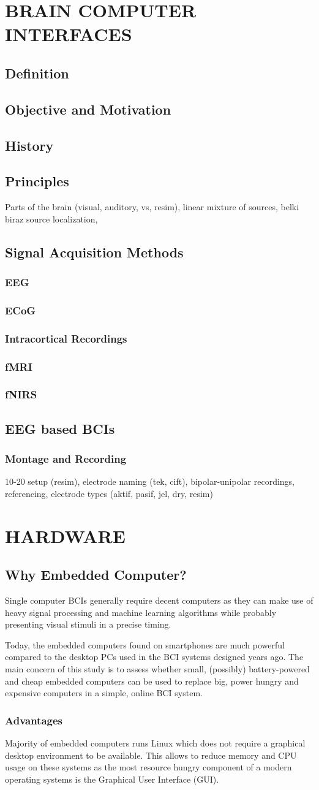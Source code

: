 \documentclass[12pt]{article}
\newcommand\mysection[1]{\vspace*{-0.35cm}\section{#1}\vspace*{6pt}\thispagestyle{empty}}
\newcommand\mysubsection[1]{\subsection{#1}}
\newcommand\mysubsubsection[1]{\subsubsection{#1}}
\numberwithin{equation}{section}
\numberwithin{figure}{section}
\numberwithin{table}{section}
\begin{document}
\mysection{BRAIN COMPUTER INTERFACES}\label{seq:bci}

\mysubsection{Definition}\label{seq:bci_definition}
\mysubsection{Objective and Motivation}\label{seq:bci_motivation}
\mysubsection{History}\label{seq:bci_history}
\mysubsection{Principles}\label{seq:bci_principles}
\par{
Parts of the brain (visual, auditory, vs, resim), linear mixture of sources, belki biraz source localization, 
}

\mysubsection{Signal Acquisition Methods}\label{seq:bci_methods}
\mysubsubsection{EEG}\label{seq:bci_methods_eeg}
\mysubsubsection{ECoG}\label{seq:bci_methods_ecog}
\mysubsubsection{Intracortical Recordings}\label{seq:bci_methods_intracortical}
\mysubsubsection{fMRI}\label{seq:bci_methods_fmri}
\mysubsubsection{fNIRS}\label{seq:bci_methods_fnirs}


\mysubsection{EEG based BCIs}\label{seq:eeg_bci}
\mysubsubsection{Montage and Recording}\label{seq:eeg_recording}
\par{
10-20 setup (resim), electrode naming (tek, cift), bipolar-unipolar recordings, referencing, 
electrode types (aktif, pasif, jel, dry, resim)
}

\clearpage
\vspace*{-0.35cm}
\mysection{HARDWARE}\label{seq:hardware}

\mysubsection{Why Embedded Computer?}\label{seq:embeddedcomputer}

\par{
Single computer BCIs generally require decent computers as they can make use of heavy signal processing 
and machine learning algorithms while probably presenting visual stimuli in a precise timing.
}

\par{
Today, the embedded computers found on smartphones are much powerful compared to the desktop PCs 
used in the BCI systems designed years ago. The main concern of this study is to assess whether small, 
(possibly) battery-powered and cheap embedded computers can be used to replace big, power hungry and 
expensive computers in a simple, online BCI system.
}

\mysubsubsection{Advantages}\label{seq:embeddedcomputer_advantages}

\par{
Majority of embedded computers runs Linux which does not require a graphical desktop environment 
to be available. This allows to reduce memory and CPU usage on these systems as the most resource 
hungry component of a modern operating systems is the Graphical User Interface (GUI).
}
\end{document}
